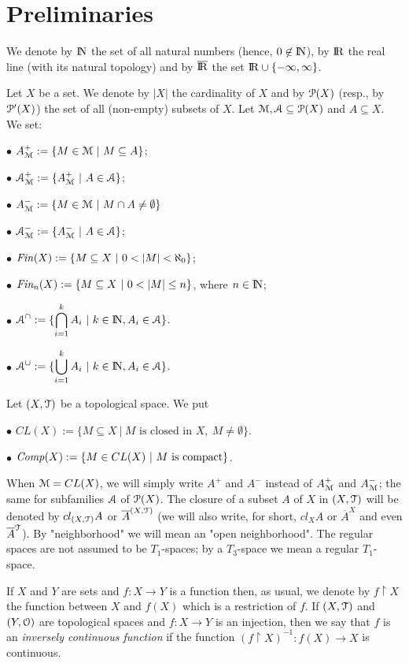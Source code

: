 \documentclass[12pt,draft,leqno]{article}
\def\ap{^\prime}
\def\st{\ |\ }
\def\AA{{\cal A}}
\def\MM{{\cal M}}
\def\OO{{\cal O}}
\def\PP{{\cal P}}
\def\TT{{\cal T}}
\def\RRRR{{\rm I}\!{\rm R}}
\def\NNNN{{\rm I}\!{\rm N}}
\begin{document}
\section{Preliminaries}

We denote by $\NNNN$ the set of all natural numbers (hence, $0\not\in\NNNN$), by $\RRRR$ the real line (with its natural topology) and by $\overline{\RRRR}$ the set $\RRRR\cup\{-\infty,\infty\}$.

Let $X$ be a set. We denote by $|X|$ the cardinality of $X$ and by $\PP(X)$ (resp., by $\PP\ap(X)$) the set of all (non-empty) subsets of $X$. Let $\MM,\AA\subseteq\PP(X)$ and $A\subseteq X$. We set:

$\bullet$ $A_{\MM}^+:=\{M\in\MM\st M\subseteq A\}$;

$\bullet$ $\AA_{\MM}^+:=\{A_{\MM}^+\st A\in\AA\}$;

$\bullet$ $A^-_{\MM}:=\{M\in\MM\st M\cap A\not=\emptyset\}$

$\bullet$ $\AA_{\MM}^-:=\{A_{\MM}^-\st A\in\AA\}$;

$\bullet$ ${\it Fin}(X):=\{M\subseteq X\st 0<|M|<\aleph_0\}$;

$\bullet$ ${\it Fin_n}(X):=\{M\subseteq X\st 0<|M|\leq n\}$, where $n\in\NNNN$;

$\bullet$ $\displaystyle\AA^{\cap}:=\{\bigcap_{i=1}^k A_i\st k\in\NNNN, A_i\in\AA\}$.

$\bullet$ $\displaystyle\AA^{\cup}:=\{\bigcup_{i=1}^k A_i\st k\in\NNNN, A_i\in\AA\}$.

\noindent Let $(X,\TT)$ be a topological space. We put

$\bullet$ $CL(X):=\{M\subseteq X\st M \mbox{ is closed in }X,\ M\not=\emptyset\}$.

$\bullet$ ${\it Comp}(X):=\{M\in CL(X)\st M \mbox{ is compact}\}$.

\noindent When $\MM=CL(X)$, we will simply write $A^+$ and $A^-$ instead of $A_{\MM}^+$ and $A_{\MM}^-$; the same for subfamilies $\AA$ of $\PP(X)$. The closure of a subset $A$ of $X$ in $(X,\TT)$ will be denoted by $cl_{(X,\TT)}A$ or $\overline{A}^{(X,\TT)}$ (we will also write, for short, $cl_XA$ or $\overline{A}^X$ and even $\overline{A}^{\TT}$). By "neighborhood" we will mean an "open neighborhood". The regular spaces are not assumed to be $T_1$-spaces; by a $T_3$-space we mean a regular $T_1$-space.

If $X$ and $Y$ are sets and $f:X\longrightarrow Y$ is a function then, as usual, we denote by $f\upharpoonright X$ the function between  $X$ and $f(X)$ which is a restriction of $f$. If $(X,\TT)$ and $(Y,\OO)$ are topological spaces and $f:X\longrightarrow Y$ is an injection, then we say that $f$ is an {\em inversely continuous function} if the function $(f\upharpoonright X)^{-1}:f(X)\longrightarrow X$ is continuous.
\end{document}
